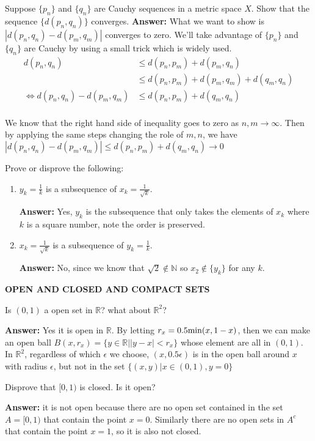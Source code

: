 \documentclass[12pt, reqno]{article} %
\newcommand{\R}{\mathbb{R}}
\newcommand{\N}{\mathbb{N}}
\newcommand{\enum}{\begin{enumerate}}
\newcommand{\fenum}{\end{enumerate}}
\begin{document}
\item * Suppose $\{p_n\}$ and $\{q_n\}$ are Cauchy sequences in a metric space $X$. Show that the sequence $\{d(p_n,q_n)\}$ converges. 
{\bf Answer:} What we want to show is $|d(p_n,q_n)-d(p_m,q_m)|$ converges to zero. We'll take advantage of $\{p_n\}$ and $\{q_n\}$ are Cauchy by using a small trick which is widely used. 
\begin{align*}
d(p_n,q_n) &\leq d(p_n,p_m)+d(p_m,q_n) \\
			&\leq d(p_n,p_m)+d(p_m,q_m)+d(q_m,q_n) \\
\iff d(p_n,q_n)-d(p_m,q_m) &\leq d(p_n,p_m)+d(q_m,q_n) \\
\end{align*}

We know that the right hand side of inequality goes to zero as $n,m \rightarrow \infty$. Then by applying the same steps changing the role of $m,n$, we have $|d(p_n,q_n)-d(p_m,q_m)| \leq d(p_n,p_m)+d(q_m,q_n) \rightarrow 0$


\item Prove or disprove the following:
\enum
\item $y_k=\frac 1 k$ is a subsequence of $x_k=\frac 1 {\sqrt{k}}$.

{\bf Answer:} Yes, $y_k$ is the subsequence that only takes the elements of $x_k$ where $k$ is a square number, note the order is preserved.
\item $x_k=\frac 1 {\sqrt{k}}$ is a subsequence of $y_k=\frac 1 k$.

{\bf Answer:} No, since we know that $\sqrt{2}\notin\N$ so $x_2\notin\{y_k\}$ for any $k$.
\fenum


\bigskip
{\bf OPEN AND CLOSED AND COMPACT SETS}

\item * Is $(0,1)$ a open set in $\R$? what about $\R^2$?

{\bf Answer:} Yes it is open in $\R$. By letting $r_x=0.5 \textnormal{min}(x,1-x)$, then we can make an open ball $B(x,r_x)=\{y\in \R | |y-x|<r_x \}$ whose element are all in $(0,1)$. In $\R^2$, regardless of which $\epsilon$ we choose, $(x,0.5\epsilon)$ is in the open ball around $x$ with radius $\epsilon$, but not in the set $\{(x,y)|x\in(0,1), y=0\}$

\item * Disprove that $[0,1)$ is closed. Is it open?

{\bf Answer:} it is not open because there are no open set contained in the set $A=[0,1)$ that contain the point $x=0$. Similarly there are no open sets in $A^c$ that contain the point $x=1$, so it is also not closed.
\end{document}

